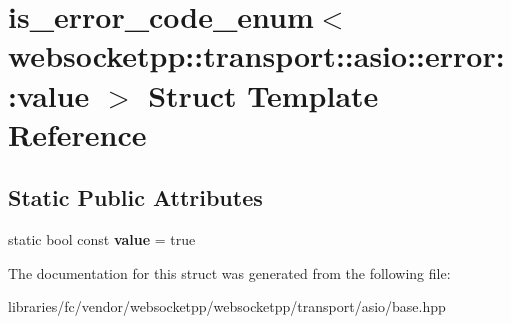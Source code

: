 \hypertarget{structis__error__code__enum_3_01websocketpp_1_1transport_1_1asio_1_1error_1_1value_01_4}{}\section{is\+\_\+error\+\_\+code\+\_\+enum$<$ websocketpp\+:\+:transport\+:\+:asio\+:\+:error\+:\+:value $>$ Struct Template Reference}
\label{structis__error__code__enum_3_01websocketpp_1_1transport_1_1asio_1_1error_1_1value_01_4}
\subsection*{Static Public Attributes}
\begin{DoxyCompactItemize}
\item 
\mbox{\label{structis__error__code__enum_3_01websocketpp_1_1transport_1_1asio_1_1error_1_1value_01_4_aae5dbb38b63c54b30712a8d9437b4aeb}} 
static bool const {\bfseries value} = true
\end{DoxyCompactItemize}


The documentation for this struct was generated from the following file\+:\begin{DoxyCompactItemize}
\item 
libraries/fc/vendor/websocketpp/websocketpp/transport/asio/base.\+hpp\end{DoxyCompactItemize}
